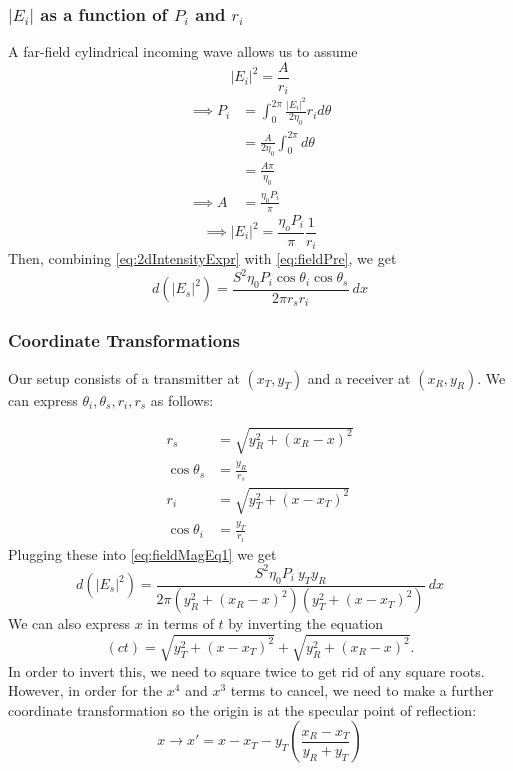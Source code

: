 \documentclass{article}
\begin{document}
\subsubsection*{$|E_i|$ as a function of $P_i$ and $r_i$}
A far-field cylindrical incoming wave allows us to assume 
\begin{equation}
   |E_i|^2 = \frac{A}{r_i}
   \label{eq:farField2d}
\end{equation}
\begin{align*}
   \implies P_i &= \int_0^{2 \pi} \frac{|E_i|^2}{2 \eta_0} r_i d \theta \\
   &= \frac{A}{2 \eta_0} \int_0^{2 \pi} d \theta \\ 
   &= \frac{A \pi}{\eta_0} \\
   \implies A &= \frac{\eta_0 P_i}{\pi}
\end{align*}
\begin{equation}
   \implies |E_i|^2 = \frac{\eta_o P_i}{\pi} \frac{1}{r_i}
   \label{eq:2dIntensityExpr}
\end{equation}
Then, combining \eqref{eq:2dIntensityExpr} with \eqref{eq:fieldPre}, we get
\begin{equation}
   d(|E_s|^2) = \frac{S^2 \eta_0 P_i \cos \theta_i \cos \theta_s }{2 \pi r_s r_i} \ dx
   \label{eq:fieldMagEq1}
\end{equation}

\subsubsection*{Coordinate Transformations}
Our setup consists of a transmitter at $(x_T, y_T)$ and a receiver at 
$(x_R, y_R)$. We can express $\theta_i, \theta_s, r_i, r_s$ as follows:

\begin{align*}
   r_s &= \sqrt{y_R^2 + (x_R - x)^2} \\
   \cos \theta_s &= \frac{y_R}{r_s} \\
   r_i &= \sqrt{y_T^2 + (x - x_T)^2} \\
   \cos \theta_i &= \frac{y_T}{r_i}
\end{align*}
Plugging these into \eqref{eq:fieldMagEq1} we get
\begin{equation}
   d(|E_s|^2) = \frac{S^2 \eta_0 P_i \ y_T y_R }{2 \pi (y_R^2 + (x_R - x)^2) ( y_T^2 + (x -
   x_T)^2)} \ dx
   \label{eq:localScaPow2dSetupParam}
\end{equation}
We can also express $x$ in terms of $t$ by inverting the equation
\[ (ct) = \sqrt{y_T^2 + (x - x_T)^2} + \sqrt{y_R^2 + (x_R - x)^2}. \] 
In order to invert this, we need to square twice to get rid of any square roots.
However, in order for the $x^4$ and $x^3$ terms to cancel, we need to make a further
coordinate transformation so the origin is at the specular point of reflection: 
\begin{equation}
   x \to x' = x -x_T - y_T \left( \frac{x_R - x_T}{y_R + y_T} \right)
   \label{eq:coordTrans}
\end{equation}
\newpage
   
\end{document}
